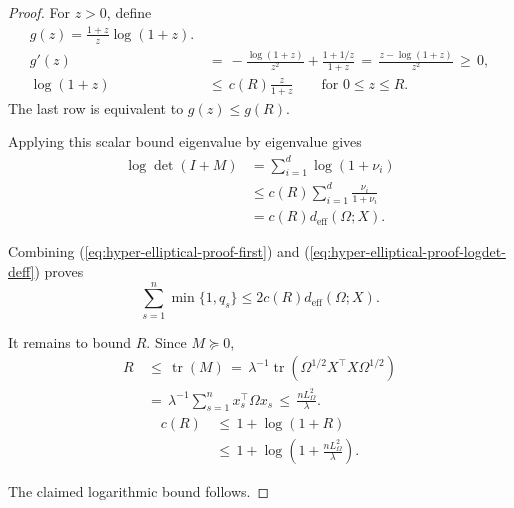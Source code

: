 \documentclass{article} %
\renewcommand{\eqref}[1]{\textup{(\ref{#1})}}
\begin{document}
\begin{proof}
For \(z>0\), define
\begin{equation}
\label{eq:hyper-elliptical-proof-scalar}
\begin{aligned}
g(z)=
\frac{1+z}{z}\log(1+z).
\\
g'(z)
&\,=\,
-\frac{\log(1+z)}{z^2}+\frac{1+1/z}{1+z}
\,=\,
\frac{z-\log(1+z)}{z^2}
\,\geq\,
0,
\\
\log(1+z)
&\,\leq\,
c(R)\frac{z}{1+z}
\qquad
\text{for \(0\leq z\leq R\)}.
\end{aligned}
\end{equation}
The last row is equivalent to \(g(z)\leq g(R)\).

Applying this scalar bound eigenvalue by eigenvalue gives
\begin{equation}
\label{eq:hyper-elliptical-proof-logdet-deff}
\begin{aligned}
\log\det(I+M)
&=
\sum_{i=1}^{d}\log(1+\nu_i)
\\
&\le
c(R)\sum_{i=1}^{d}\frac{\nu_i}{1+\nu_i}
\\
&=
c(R)d_{\mathrm{eff}}(\Omega;X).
\end{aligned}
\end{equation}

Combining \eqref{eq:hyper-elliptical-proof-first} and \eqref{eq:hyper-elliptical-proof-logdet-deff} proves
\begin{equation}
\label{eq:hyper-elliptical-proof-main}
\sum_{s=1}^{n}\min\{1,q_s\}
\le
2c(R)d_{\mathrm{eff}}(\Omega;X).
\end{equation}

It remains to bound \(R\).  Since \(M\succeq 0\),
\begin{equation}
\label{eq:hyper-elliptical-proof-R}
\begin{aligned}
R
&\,\leq\,
\operatorname{tr}(M)
\,=\,
\lambda^{-1}
\operatorname{tr}\!\left(\Omega^{1/2}X^\top X\Omega^{1/2}\right)
\\
&\,=\,
\lambda^{-1}
\sum_{s=1}^{n}
x_s^\top\Omega x_s
\,\leq\,
\frac{nL_{\Omega}^2}{\lambda}.
\end{aligned}
\end{equation}
\begin{equation}
\label{eq:hyper-elliptical-proof-logT}
\begin{aligned}
c(R)
&\,\leq\,
1+\log(1+R)
\\
&\,\leq\,
1+\log\!\left(1+\frac{nL_{\Omega}^2}{\lambda}\right).
\end{aligned}
\end{equation}

The claimed logarithmic bound follows.
\end{proof}
\end{document}
